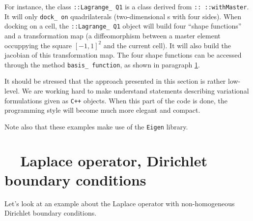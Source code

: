 For instance, the class {\small\tt {}::Lagrange\_\,Q1} is a class derived from
{\small\tt {}:: ::withMaster}.
It will only {\small\tt dock\_\,on} quadrilaterals (two-dimensional {\small\tt {}}s
with four sides).
When docking on a cell, the {\small\tt {}::Lagrange\_\,Q1} object will build four
``shape functions'' and a transformation map (a diffeomorphism between a master element
occuppying the square $ [-1, 1]^2 $ and the current cell).
It will also build the jacobian of this transformation map.
The four shape functions can be accessed through the method {\small\tt basis\_\,function},
as shown in paragraph \ref{\numb section 6.\numb parag 2}.

It should be stressed that the approach presented in this section is rather low-level.
We are working hard to make {\maniFEM} understand statements describing variational
formulations given as {\tt C++} objects.
When this part of the code is done, the programming style will become much more elegant
and compact.

Note also that these examples make use of the {\small\tt Eigen} library.


\section{~~Laplace operator, Dirichlet boundary conditions}\label{\numb section 6.\numb parag 2}
\vskip 1mm

Let's look at an example about the Laplace operator with non-homogeneous Dirichlet
boundary conditions.
\vskip 1mm

